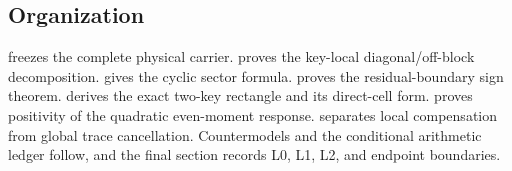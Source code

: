 \subsection{Organization}

 freezes the complete physical carrier.
 proves the key-local diagonal/off-block decomposition.
 gives the cyclic sector formula.
 proves the residual-boundary sign theorem.
 derives the exact two-key rectangle and its direct-cell
form.   proves positivity of the quadratic
even-moment response.   separates local compensation
from global trace cancellation.  Countermodels and the conditional
arithmetic ledger follow, and the final section records L0, L1, L2, and
endpoint boundaries.

